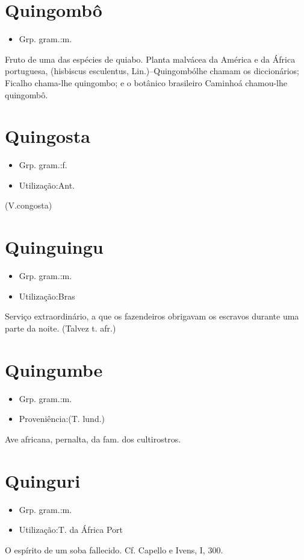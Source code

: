 \section{Quingombô}
\begin{itemize}
\item {Grp. gram.:m.}
\end{itemize}
Fruto de uma das espécies de quiabo.
Planta malvácea da América e da África portuguesa, (\textunderscore hisbiscus esculentus\textunderscore , Lin.)--\textunderscore Quingombó\textunderscore  lhe chamam os diccionários; Ficalho chama-lhe \textunderscore quingombo\textunderscore ; e o botânico brasileiro Caminhoá chamou-lhe \textunderscore quingombô\textunderscore .
\section{Quingosta}
\begin{itemize}
\item {Grp. gram.:f.}
\end{itemize}
\begin{itemize}
\item {Utilização:Ant.}
\end{itemize}
(V.congosta)
\section{Quinguingu}
\begin{itemize}
\item {Grp. gram.:m.}
\end{itemize}
\begin{itemize}
\item {Utilização:Bras}
\end{itemize}
Serviço extraordinário, a que os fazendeiros obrigavam os escravos durante uma parte da noite.
(Talvez t. afr.)
\section{Quingumbe}
\begin{itemize}
\item {Grp. gram.:m.}
\end{itemize}
\begin{itemize}
\item {Proveniência:(T. lund.)}
\end{itemize}
Ave africana, pernalta, da fam. dos cultirostros.
\section{Quinguri}
\begin{itemize}
\item {Grp. gram.:m.}
\end{itemize}
\begin{itemize}
\item {Utilização:T. da África Port}
\end{itemize}
O espírito de um soba fallecido. Cf. Capello e Ivens, I, 300.

